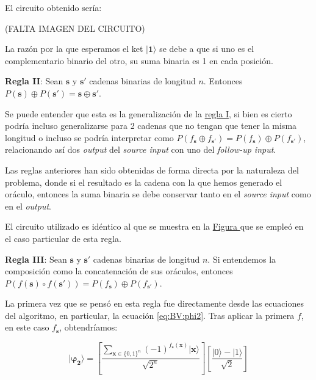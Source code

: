 El circuito obtenido sería: \newline

 (FALTA IMAGEN DEL CIRCUITO)\newline

La razón por la que esperamos el ket $|\mathbf{1}\rangle$ se debe a que si uno es el complementario binario del otro, su suma binaria es 1 en cada posición.\newline

\textbf{Regla II}: Sean $\mathbf{s}$ y $\mathbf{s}'$ cadenas binarias de longitud $n$. Entonces $P(\mathbf{s})\oplus P(\mathbf{s}')=\mathbf{s} \oplus \mathbf{s}'$.\newline

 Se puede entender que esta es la generalización de la \hyperref[R:BV:1]{regla I}, si bien es cierto podría incluso generalizarse para 2 cadenas que no tengan que tener la misma longitud o incluso se podría interpretar como $P(f_{\mathbf{s}
}\oplus f_{\mathbf{s}'})=P(f_{\mathbf{s}})\oplus P(f_{\mathbf{s}'})$, relacionando así dos \textit{output} del \textit{source input} con uno del \textit{follow-up input}.\newline

 Las reglas anteriores han sido obtenidas de forma directa por la naturaleza del problema, donde si el resultado es la cadena con la que hemos generado el oráculo, entonces la suma binaria se debe conservar tanto en el \textit{source input} como en el \textit{output}.\newline

 El circuito utilizado es idéntico al que se muestra en la \hyperref[Fig:BVRule1]{Figura } que se empleó en el caso particular de esta regla. \newline

 \textbf{Regla III}\label{RIII:BV}: Sean $\mathbf{s}$ y $\mathbf{s}'$ cadenas binarias de longitud $n$. Si entendemos la composición como la concatenación de sus oráculos, entonces $P(f(\mathbf{s}) \circ f(\mathbf{s}'))= P(f_{\mathbf{s}}) \oplus P(f_{\mathbf{s}'})$.\newline

 La primera vez que se pensó en esta regla fue directamente desde las ecuaciones del algoritmo, en particular, la ecuación \ref{eq:BV:phi2}. Tras aplicar la primera $f$, en este caso $f_{\mathbf{s}}$, obtendríamos:

 \begin{equation} 
    \mathbf{|\varphi_{2}\rangle} =\left[ \dfrac{\sum_{\mathbf{x} \in \{0,1\}^{n}}(-1)^{f_{\mathbf{s}}(\mathbf{x})}|\mathbf{x}\rangle}{\sqrt{2^{n}}}\right] \left[ \dfrac{|0\rangle - |1\rangle}{\sqrt{2}}\right]\end{equation}\newline

